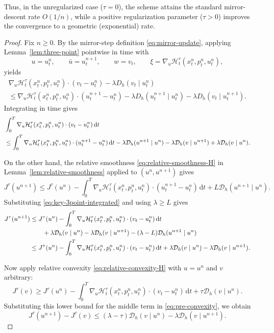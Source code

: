 \documentclass[11pt]{amsart}
\theoremstyle{plain}
\theoremstyle{definition}
\theoremstyle{remark}
\newcommand{\dd}{\,\mathrm{d}}
\begin{document}
Thus, in the unregularized case ($\tau = 0$), the scheme attains the standard mirror-descent rate $O(1/n)$, while a positive regularization parameter ($\tau > 0$) improves the convergence to a geometric (exponential) rate.

\begin{proof}
Fix $n\ge 0$. By the mirror-step definition \eqref{eq:mirror-update}, applying Lemma~\ref{lem:three-point} pointwise in time with
\[
u=u_t^n,\qquad
\bar u=u_t^{n+1},\qquad
w=v_t,\qquad
\xi=\nabla_u \mathcal H_t^\tau(x_t^n,p_t^n,u_t^n),
\]
yields
\begin{multline*}
    \nabla_u \mathcal H_t^\tau(x_t^n,p_t^n,u_t^n)\cdot(v_t-u_t^n) - \lambda D_h(v_t\mid u_t^n) \\
    \le
\nabla_u \mathcal H_t^\tau(x_t^n,p_t^n,u_t^n)\cdot(u_t^{n+1}-u_t^n)
- \lambda D_h(u_t^{n+1}\mid u_t^n) - \lambda D_h(v_t\mid u_t^{n+1}).
\end{multline*}
Integrating in time gives
\begin{align}
&\int_0^T \nabla_u \mathcal H_t^\tau(x_t^n,p_t^n,u_t^n)\cdot(v_t-u_t^n)\dd t \notag\\
& \le
\int_0^T \nabla_u \mathcal H_t^\tau(x_t^n,p_t^n,u_t^n)\cdot(u_t^{n+1}-u_t^n)\dd t
-\lambda \mathcal{D}_h(u^{n+1}\mid u^n)
-\lambda \mathcal{D}_h(v\mid u^{n+1})
+\lambda \mathcal{D}_h(v\mid u^n).
\label{eq:key-3point-integrated}
\end{align}

On the other hand, the relative smoothness \eqref{eq:relative-smoothness-H} in Lemma~\ref{lem:relative-smoothness} applied to $(u^n,u^{n+1})$ gives
\[
J^\tau(u^{n+1})
\le
J^\tau(u^n)
-
\int_0^T \nabla_u \mathcal H_t^\tau(x_t^n,p_t^n,u_t^n)\cdot(u_t^{n+1}-u_t^n)\dd t
+
L \mathcal{D}_h(u^{n+1}\mid u^n).
\]
Substituting \eqref{eq:key-3point-integrated} and using $\lambda\ge L$ gives
\begin{align}
J^\tau(u^{n+1})
&\le
J^\tau(u^n)
-
\int_0^T \nabla_u \mathcal H_t^\tau(x_t^n,p_t^n,u_t^n)\cdot(v_t-u_t^n)\dd t \notag\\
&\qquad
+\lambda \mathcal{D}_h(v\mid u^n)-\lambda \mathcal{D}_h(v\mid u^{n+1})
-(\lambda-L)\mathcal{D}_h(u^{n+1}\mid u^n) \notag\\
&\le
J^\tau(u^n)
-
\int_0^T \nabla_u \mathcal H_t^\tau(x_t^n,p_t^n,u_t^n)\cdot(v_t-u_t^n)\dd t
+\lambda \mathcal{D}_h(v\mid u^n)-\lambda \mathcal{D}_h(v\mid u^{n+1}).
\label{eq:pre-convexity}
\end{align}

Now apply relative convexity \eqref{eq:relative-convexity-H} with $u=u^n$ and $v$ arbitrary:
\[
J^\tau(v)
\ge
J^\tau(u^n)
-
\int_0^T \nabla_u \mathcal H_t^\tau(x_t^n,p_t^n,u_t^n)\cdot(v_t-u_t^n)\dd t
+
\tau \mathcal{D}_h(v\mid u^n).
\]
Substituting this lower bound for the middle term in \eqref{eq:pre-convexity}, we obtain
\begin{equation}\label{eq:master-ineq}
J^\tau(u^{n+1})-J^\tau(v)
\le
(\lambda-\tau)\mathcal{D}_h(v\mid u^n)-\lambda \mathcal{D}_h(v\mid u^{n+1}).
\end{equation}


\end{proof}
\end{document}
